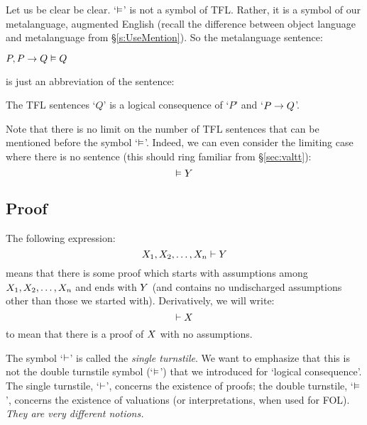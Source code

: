 Let us be clear be clear. `$\vDash$' is not a symbol of TFL. Rather, it is a symbol of our metalanguage, augmented English (recall the difference between object language and metalanguage from \S\ref{s:UseMention}). So the metalanguage sentence:
\begin{ebullet}
	\item $P, P \rightarrow Q \vDash Q$
\end{ebullet}
is just an abbreviation of the sentence:
\begin{ebullet}
	\item The TFL sentences `$Q$' is a logical consequence of `$P$' and `$P \rightarrow Q$'.
\end{ebullet}
Note that there is no limit on the number of TFL sentences that can be mentioned before the symbol `$\vDash$'. Indeed, we can even consider the limiting case where there is no sentence (this should ring familiar from \S\ref{sec:valtt}):
$$\vDash Y$$

\subsection{Proof}
The following expression:
$$X_1, X_2, \ldots, X_n \vdash Y$$
means that there is some proof which starts with assumptions among $X_1, X_2, \ldots, X_n$ and ends with $Y$ (and contains no undischarged assumptions other than those we started with). Derivatively, we will write:
$$\vdash X$$
to mean that there is a proof of $X$ with no assumptions.

The symbol `$\vdash$' is called the \emph{single turnstile}. We want to emphasize that this is not the {double turnstile} symbol (`$\vDash$') that we introduced  for `logical consequence'. The single turnstile, `$\vdash$', concerns the existence of proofs; the double turnstile, `$\vDash$', concerns the existence of valuations (or interpretations, when used for FOL). \emph{They are very different notions.}




